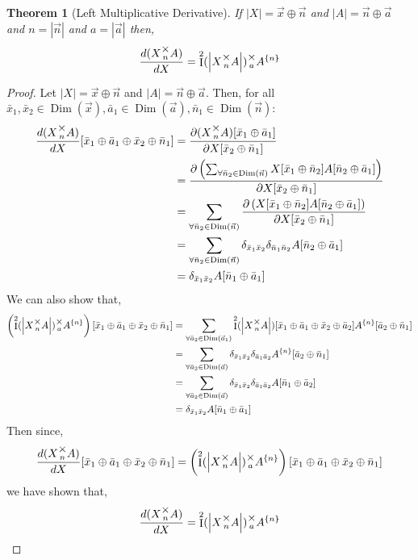 \documentclass[12pt]{book}
\theoremstyle{plain}
\newtheorem{theorem}{Theorem}[chapter]
\theoremstyle{definition}
\theoremstyle{ppart}
\theoremstyle{case}
\theoremstyle{solution}
\DeclareMathOperator{\Dim}{Dim}
\DeclareMathOperator{\Ident}{I}
\newcommand{\mmult}[1]{\text{\raisebox{1ex}{$\underset{#1}{\times}$}}}
\newcommand{\shape}[1]{\left|#1\right|}
\newcommand{\transpose}[2]{{#1}^{\{#2\}}}
\begin{document}
\begin{landscape}
\begin{theorem}[Left Multiplicative Derivative]
\label{left_mult_derivative}
If $\shape{X} = \vec{x} \oplus \vec{n}$ and $\shape{A} = \vec{n} \oplus \vec{a}$
and $n = \shape{\vec{n}}$ and $a = \shape{\vec{a}}$ then,
\[ \frac{d(X \mmult{n} A)}{dX} = \Ident^2(\shape{X \mmult{n} A}) \mmult{a} \transpose{A}{n} \]
\end{theorem}
\begin{proof}
Let $\shape{X} = \vec{x} \oplus \vec{n}$ and $\shape{A} = \vec{n} \oplus \vec{a}$. Then,
for all
$\bar{x}_1, \bar{x}_2 \in \Dim(\vec{x}), \bar{a}_1 \in \Dim(\vec{a}),
\bar{n}_1 \in \Dim(\vec{n}):$
\begin{align*}
	\frac{d(X \mmult{n} A)}{dX}
	[\bar{x}_1 \oplus \bar{a}_1 \oplus \bar{x}_2 \oplus \bar{n}_1]
	&= 
	\frac{
		\partial (X \mmult{n} A) [\bar{x}_1 \oplus \bar{a}_1]
	}{\partial X[\bar{x}_2 \oplus \bar{n}_1]} \\
	&= 
	\frac{
		\partial \left(
			\sum_{\forall \bar{n}_2 \in \Dim(\vec{n})}
			X[\bar{x}_1 \oplus \bar{n}_2] A[\bar{n}_2 \oplus \bar{a}_1]
		\right)
	}{\partial X[\bar{x}_2 \oplus \bar{n}_1]} \\
	&= 
	\sum_{\forall \bar{n}_2 \in \Dim(\vec{n})}
	\frac{
		\partial \left(
			X[\bar{x}_1 \oplus \bar{n}_2] A[\bar{n}_2 \oplus \bar{a}_1]
		\right)
	}{\partial X[\bar{x}_2 \oplus \bar{n}_1]} \\
	&= 
	\sum_{\forall \bar{n}_2 \in \Dim(\vec{n})}
	\delta_{\bar{x}_1\bar{x}_2}
	\delta_{\bar{n}_1\bar{n}_2}
	A[\bar{n}_2 \oplus \bar{a}_1] \\
	&= 
	\delta_{\bar{x}_1\bar{x}_2}
	A[\bar{n}_1 \oplus \bar{a}_1]
\end{align*}
We can also show that,
\begin{align*}
	\left(\Ident^2(\shape{X \mmult{n} A}) \mmult{a} \transpose{A}{n}\right)
	[\bar{x}_1 \oplus \bar{a}_1 \oplus \bar{x}_2 \oplus \bar{n}_1]
	&=
	\sum_{\forall \bar{a}_2 \in \Dim(\vec{a}_1)}
	\Ident^2(\shape{X \mmult{n} A})[\bar{x}_1 \oplus \bar{a}_1 \oplus \bar{x}_2 \oplus \bar{a}_2]
	\transpose{A}{n}[\bar{a}_2 \oplus \bar{n}_1] \\
	&=
	\sum_{\forall \bar{a}_2 \in \Dim(\vec{a})}
	\delta_{\bar{x}_1 \bar{x}_2} \delta_{\bar{a}_1 \bar{a}_2}
	\transpose{A}{n}[\bar{a}_2 \oplus \bar{n}_1] \\
	&=
	\sum_{\forall \bar{a}_2 \in \Dim(\vec{a})}
	\delta_{\bar{x}_1 \bar{x}_2} \delta_{\bar{a}_1 \bar{a}_2}
	A[\bar{n}_1 \oplus \bar{a}_2] \\
	&=
	\delta_{\bar{x}_1 \bar{x}_2}
	A[\bar{n}_1 \oplus \bar{a}_1]
\end{align*}
Then since,
\[
	\frac{d(X \mmult{n} A)}{dX}
	[\bar{x}_1 \oplus \bar{a}_1 \oplus \bar{x}_2 \oplus \bar{n}_1]
	=
	\left(\Ident^2(\shape{X \mmult{n} A}) \mmult{a} \transpose{A}{n}\right)
	[\bar{x}_1 \oplus \bar{a}_1 \oplus \bar{x}_2 \oplus \bar{n}_1]
\]
we have shown that,
\[
	\frac{d(X \mmult{n} A)}{dX}
	=
	\Ident^2(\shape{X \mmult{n} A}) \mmult{a} \transpose{A}{n}
\]
\end{proof}
\end{landscape}
\end{document}
